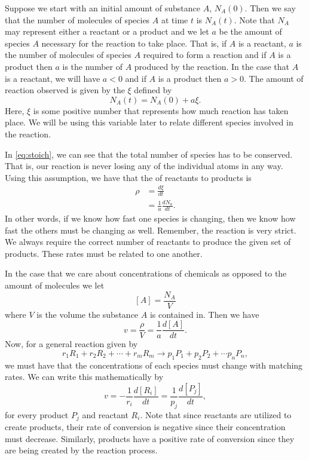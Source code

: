         Suppose we start with an initial amount of substance $A$, $N_A(0)$. Then we say that the number of molecules of species $A$ at time $t$ is $N_{A}(t)$. Note that $N_A$ may represent either a reactant or a product and we let $a$ be the amount of species $A$ necessary for the reaction to take place.  That is, if $A$ is a reactant, $a$ is the number of molecules of species $A$ required to form a reaction and if $A$ is a product then $a$ is the number of $A$ produced by the reaction. In the case that $A$ is a reactant, we will have $a<0$ and if $A$ is a product then $a>0$. The amount of reaction observed is given by the  $\xi$ defined by
        \[
        N_A(t) = N_A(0)+a\xi.
        \]
        Here, $\xi$ is some positive number that represents how much reaction has taken place.  We will be using this variable later to relate different species involved in the reaction. 

        In \ref{eq:stoich}, we can see that the total number of species has to be conserved. That is, our reaction is never losing any of the individual atoms in any way.  Using this assumption, we have that the  of reactants to products is 
        \begin{align*}
            \rho &= \frac{d\xi}{dt}\\
            &= \frac{1}{a}\frac{dN_a}{dt}.
        \end{align*}
        In other words, if we know how fast one species is changing, then we know how fast the others must be changing as well.  Remember, the reaction is very strict.  We always require the correct number of reactants to produce the given set of products.  These rates must be related to one another.
        
        In the case that we care about concentrations of chemicals as opposed to the amount of molecules we let
        \[
        [A]=\frac{N_A}{V}
        \]
        where $V$ is the volume the substance $A$ is contained in.  Then we have
        \[
        v=\frac{\rho}{V}=\frac{1}{a}\frac{d[A]}{dt}.
        \]
        Now, for a general reaction given by
        \[
        r_1R_1 + r_2R_2 + \cdots + r_mR_m \to p_1 P_1 + p_2P_2 +\cdots p_n P_n,
        \]
        we must have that the concentrations of each species must change with matching rates.  We can write this mathematically by
        \[
        v=-\frac{1}{r_i}\frac{d[R_i]}{dt}=\frac{1}{p_j}\frac{d[P_j]}{dt},
        \]
        for every product $P_j$ and reactant $R_i$. Note that since reactants are utilized to create products, their rate of conversion is negative since their concentration must decrease.  Similarly, products have a positive rate of conversion since they are being created by the reaction process.
        
